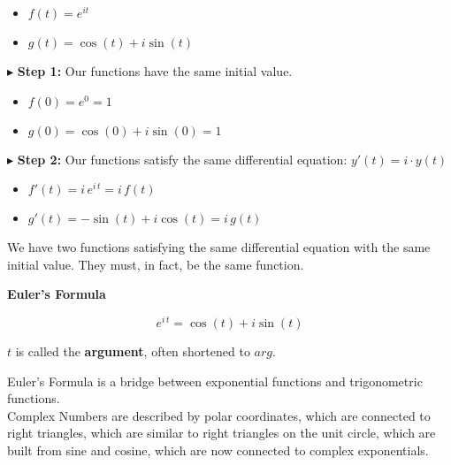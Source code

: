 \documentclass{ximera}
\begin{document}
\begin{itemize}
	\item $f(t) = e^{i t}$
	\item $g(t) = \cos(t) + i \sin(t)$
\end{itemize}




$\blacktriangleright$   \textbf{Step 1:} Our functions have the same initial value.

\begin{itemize}
	\item $f(0) = e^0 = 1$
	\item $g(0) = \cos(0) + i \sin(0) = 1$
\end{itemize}





$\blacktriangleright$   \textbf{Step 2:} Our functions satisfy the same differential equation: $y'(t) = i \cdot y(t)$



\begin{itemize}
	\item $f'(t) = i \, e^{i \, t} = i \, f(t)$
	\item $g'(t) = -\sin(t) + i \cos(t) = i \, g(t)$
\end{itemize}



We have two functions satisfying the same differential equation with the same initial value.  They must, in fact, be the same function. \\




\begin{theorem} \textbf{\textcolor{green!50!black}{Euler's Formula}}   


\[   e^{i \, t} = \cos(t) + i \sin(t)         \]



$t$ is called the \textbf{argument}, often shortened to \textbf{\textcolor{green!50!black}{$arg$}}.  

\end{theorem}




Euler's Formula is a bridge between exponential functions and trigonometric functions. \\




Complex Numbers are described by polar coordinates, which are connected to right triangles, which are similar to right triangles on the unit circle, which are built from sine and cosine, which are now connected to complex exponentials.
\end{document}
